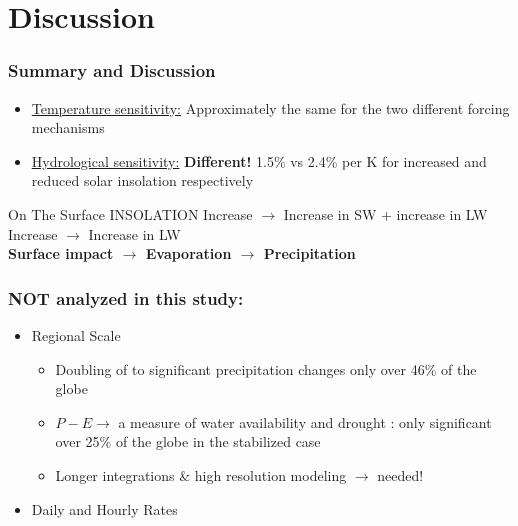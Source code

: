 \documentclass{beamer}
\begin{document}
\section{Discussion}
\begin{frame}
\frametitle{Summary and Discussion}
\begin{itemize}
\item \underline{Temperature sensitivity:} Approximately the same for the two different forcing mechanisms
\vspace{0.3cm}
\item \underline{Hydrological sensitivity:} {\bf\color{bgblue}Different!} 1.5\% vs 2.4\% per K for increased  and reduced solar insolation respectively
\end{itemize}
\vspace{1cm}
\begin{block}{\centering On The Surface}
\centering INSOLATION Increase $\rightarrow$ Increase in SW + increase in LW\\
                   Increase $\rightarrow$ Increase in LW\\\vspace{0.2cm}\vspace{0.1cm}
{\bf\color{red} Surface impact  $\rightarrow$  Evaporation $\rightarrow$ Precipitation}
\end{block}
\end{frame}

\begin{frame}
\frametitle{NOT analyzed in this study:}
\begin{itemize}
	\item Regional Scale
		\begin{itemize}
		\vspace{0.2cm}
		\item Doubling of  to significant precipitation changes only over 46\% of the globe
		\vspace{0.2cm}
		\item $P-E \rightarrow$ a measure of water availability and drought : only significant over 25\% of the globe in the stabilized case
		\vspace{0.2cm}
		\item Longer integrations \& high resolution modeling $\rightarrow$ needed! 
	\end{itemize}
	\vspace {0.5cm}
	\item Daily and Hourly Rates
\end{itemize}
\end{frame}
\end{document}
